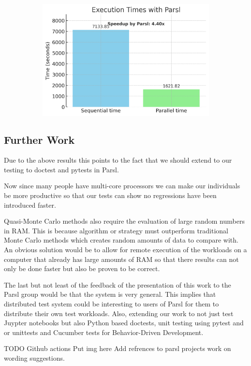 \begin{figure}[tbp]
\centering
\begin{subfigure}[t]{0.49\textwidth}
\centering
\includegraphics[width=\textwidth]{booktests/parsl_speedup_chart_no_x_lines.png}
\caption{}
\label{fig:bm_iid}
\end{subfigure}

\end{figure}


\subsection{Further Work}

Due to the above results this points to the fact that we should extend to our testing to doctest and pytests in Parsl.

Now since many people have multi-core processors we can make our individuals be more productive so that our tests can show no regressions have been introduced faster.

Quasi-Monte Carlo methods also require the evaluation of large random numbers in RAM. This is because algorithm or strategy must outperform traditional Monte Carlo methods which creates random amounts of data to compare with. An obvious solution would be to allow for remote execution of the workloads on a computer that already has large amounts of RAM so that there results can not only be done faster but also be proven to be correct.

The last but not least of the feedback of the presentation of this work to the Parsl group would be that the system is very general. This implies that distributed test system could be interesting to users of Parsl for them to distribute their own test workloads. 
Also, extending our work to not just test Juypter notebooks but also Python based doctests, unit testing using pytest and or unittests and Cucumber tests for Behavior-Driven Development.


TODO 
Github actions
Put img here
Add refrences to parsl projects
work on wording suggestions.